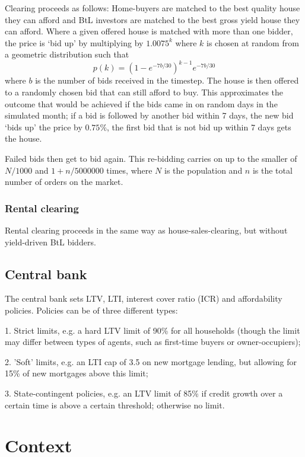 \documentclass{report}
\begin{document}
Clearing proceeds as follows: Home-buyers are matched to the best quality
house they can afford and BtL investors are matched to the best gross yield house they can afford. Where a given offered house is matched with more than one bidder, the price is `bid up' by multiplying by $1.0075^k$ where $k$ is chosen at random from a geometric distribution such that
\[
p(k) = (1-e^{-7b/30})^{k-1}e^{-7b/30}
\]
where $b$ is the number of bids received in the timestep. The house is then offered to a randomly chosen bid that can still afford to buy. This approximates the outcome that would be achieved if the bids came in on random days in the simulated month; if a bid is followed by another bid within 7 days, the new bid `bids up' the price by $0.75\%$, the first bid that is not bid up within 7 days gets the house.

Failed bids then get to bid again. This re-bidding carries on up to the smaller of $N/1000$ and $1+n/5000000$ times, where $N$ is the population and $n$ is the total number of orders on the market.

\subsection{Rental clearing}

Rental clearing proceeds in the same way as house-sales-clearing, but
without yield-driven BtL bidders.\bigskip

\section{Central bank}

The central bank sets LTV, LTI, interest cover ratio (ICR) and affordability
policies. Policies can be of three different types:

1. Strict limits, e.g. a hard LTV limit of 90\% for all households (though
the limit may differ between types of agents, such as first-time buyers or
owner-occupiers);

2. 'Soft' limits, e.g. an LTI cap of 3.5 on new mortgage lending, but
allowing for 15\% of new mortgages above this limit;

3. State-contingent policies, e.g. an LTV limit of 85\% if credit growth
over a certain time is above a certain threshold; otherwise no limit.

\chapter{Context}
\end{document}
